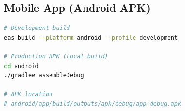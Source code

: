 \subsection{Mobile App (Android APK)}

\begin{lstlisting}[language=bash, caption={Android APK Build Command}]
# Development build
eas build --platform android --profile development

# Production APK (local build)
cd android
./gradlew assembleDebug

# APK location
# android/app/build/outputs/apk/debug/app-debug.apk
\end{lstlisting}
